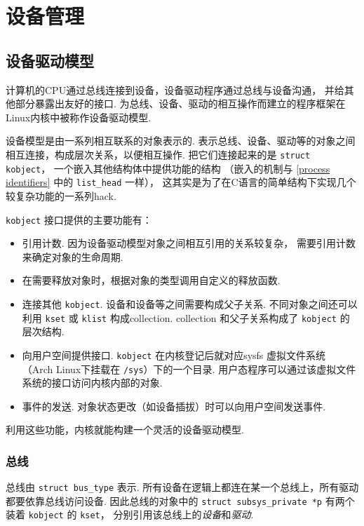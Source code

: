 \section{设备管理}
\subsection{设备驱动模型}
计算机的CPU通过总线连接到设备，设备驱动程序通过总线与设备沟通，
并给其他部分暴露出友好的接口.
为总线、设备、驱动的相互操作而建立的程序框架在Linux内核中被称作设备驱动模型.
\cite{devicemodel}\cite{bovet2005understanding}

设备模型是由一系列相互联系的对象表示的.
表示总线、设备、驱动等的对象之间相互连接，构成层次关系，以便相互操作.
把它们连接起来的是 \lstinline{struct kobject}，
一个嵌入其他结构体中提供功能的结构
（嵌入的机制与 \ref{process identifiers} 中的 \lstinline{list_head} 一样），
这其实是为了在C语言的简单结构下实现几个较复杂功能的一系列hack.

\lstinline{kobject} 接口提供的主要功能有\cite{kobject}：
\begin{itemize}
	\item 引用计数. 因为设备驱动模型对象之间相互引用的关系较复杂，
	      需要引用计数来确定对象的生命周期.
	\item 在需要释放对象时，根据对象的类型调用自定义的释放函数.
	\item 连接其他 \lstinline{kobject}.
	      设备和设备等之间需要构成父子关系.
	      不同对象之间还可以利用 \lstinline{kset} 或 \lstinline{klist} 构成collection.
	      collection 和父子关系构成了 \lstinline{kobject} 的层次结构.
	\item 向用户空间提供接口.
	      \lstinline{kobject} 在内核登记后就对应sysfs 虚拟文件系统
	      （Arch Linux下挂载在 \lstinline{/sys}）下的一个目录.
	      用户态程序可以通过该虚拟文件系统的接口访问内核内部的对象.
	\item 事件的发送. 对象状态更改（如设备插拔）时可以向用户空间发送事件.
\end{itemize}
利用这些功能，内核就能构建一个灵活的设备驱动模型.

\subsubsection{总线}
总线由 \lstinline{struct bus_type} 表示.
所有设备在逻辑上都连在某一个总线上，所有驱动都要依靠总线访问设备.
因此总线的对象中的 \lstinline{struct subsys_private *p}
有两个装着 \lstinline{kobject} 的 \lstinline{kset}，
分别引用该总线上的\emph{设备}和\emph{驱动}.

